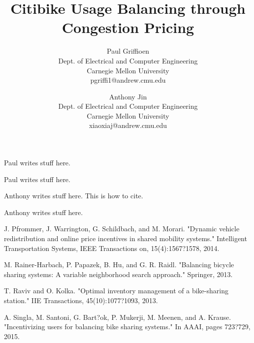 \documentclass[times, 10pt,twocolumn]{article}
\begin{document}
\title{Citibike Usage Balancing through Congestion Pricing}

\author{Paul Griffioen\\Dept. of Electrical and Computer Engineering\\Carnegie Mellon University\\ pgriffi1@andrew.cmu.edu\\
\and
Anthony Jin\\Dept. of Electrical and Computer Engineering\\Carnegie Mellon University\\xiaoxiaj@andrew.cmu.edu\\
}

\maketitle
\thispagestyle{empty}


Paul writes stuff here.


Paul writes stuff here.


Anthony writes stuff here. This is how to cite. \cite{redistribution}


Anthony writes stuff here.

\nocite{ex1,ex2}



\begin{thebibliography}{}

J. Pfrommer, J. Warrington, G. Schildbach, and M. Morari. "Dynamic vehicle redistribution and online price incentives in shared mobility systems." Intelligent Transportation Systems, IEEE Transactions on, 15(4):1567?1578, 2014.

M. Rainer-Harbach, P. Papazek, B. Hu, and G. R. Raidl. "Balancing bicycle sharing systems: A variable neighborhood search approach." Springer, 2013.

T. Raviv and O. Kolka. "Optimal inventory management of a bike-sharing station." IIE Transactions, 45(10):1077?1093, 2013.

A. Singla, M. Santoni, G. Bart?ok, P. Mukerji, M. Meenen, and A. Krause. "Incentivizing users for balancing bike sharing systems." In AAAI, pages 723?729, 2015.

\end{thebibliography}
\end{document}
